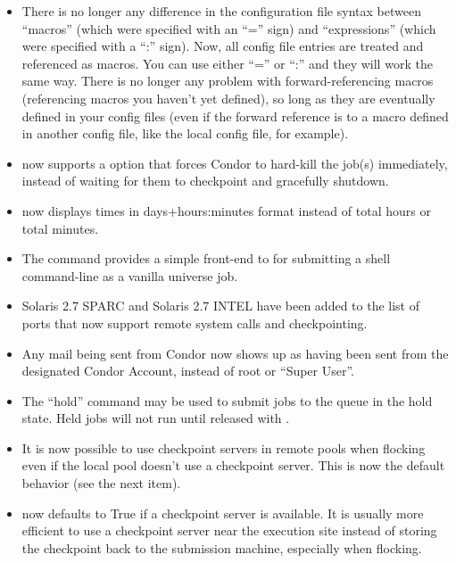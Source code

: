 \begin{itemize}

\item There is no longer any difference in the configuration file
syntax between ``macros'' (which were specified with an ``='' sign)
and ``expressions'' (which were specified with a ``:'' sign).  
Now, all config file entries are treated and referenced as macros. 
You can use either ``='' or ``:'' and they will work the same way. 
There is no longer any problem with forward-referencing macros
(referencing macros you haven't yet defined), so long as they are
eventually defined in your config files (even if the forward reference
is to a macro defined in another config file, like the local config
file, for example).

\item {} now supports a  option that forces
Condor to hard-kill the job(s) immediately, instead of waiting for
them to checkpoint and gracefully shutdown.

\item {} now displays times in days+hours:minutes format
instead of total hours or total minutes.

\item The  command provides a simple front-end to
 for submitting a shell command-line as a vanilla
universe job.

\item Solaris 2.7 SPARC and Solaris 2.7 INTEL have been added to the
list of ports that now support remote system calls and checkpointing.

\item Any mail being sent from Condor now shows up as having been sent from
the designated Condor Account, instead of root or ``Super User''.

\item The  ``hold'' command may be used to submit jobs
to the queue in the hold state.  Held jobs will not run until released
with .

\item It is now possible to use checkpoint servers in remote pools
when flocking even if the local pool doesn't use a checkpoint server.
This is now the default behavior (see the next item).

\item {} now defaults to True if a checkpoint
server is available.  It is usually more efficient to use a checkpoint
server near the execution site instead of storing the checkpoint back
to the submission machine, especially when flocking.


\end{itemize}
